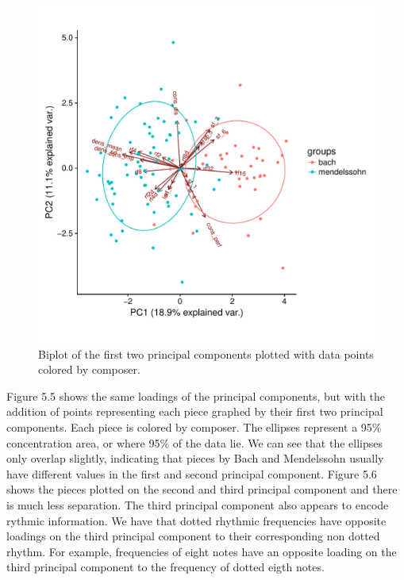 \documentclass[12pt,twoside]{reedthesis}
\theoremstyle{definition}
\theoremstyle{definition}
\theoremstyle{definition}
\theoremstyle{remark}
\begin{document}
\begin{figure}[H]
\centering
\includegraphics[scale = .5]{images/bi_elipse12.pdf}
\caption{Biplot of the first two principal components plotted with data points colored by composer. }
\label{subd}
\end{figure}
Figure 5.5 shows the same loadings of the principal components, but with
the addition of points representing each piece graphed by their first
two principal components. Each piece is colored by composer. The
ellipses represent a 95\% concentration area, or where 95\% of the data
lie. We can see that the ellipses only overlap slightly, indicating that
pieces by Bach and Mendelssohn usually have different values in the
first and second principal component. Figure 5.6 shows the pieces
plotted on the second and third principal component and there is much
less separation. The third principal component also appears to encode
rythmic information. We have that dotted rhythmic frequencies have
opposite loadings on the third principal component to their
corresponding non dotted rhythm. For example, frequencies of eight notes
have an opposite loading on the third principal component to the
frequency of dotted eigth notes.
\end{document}
